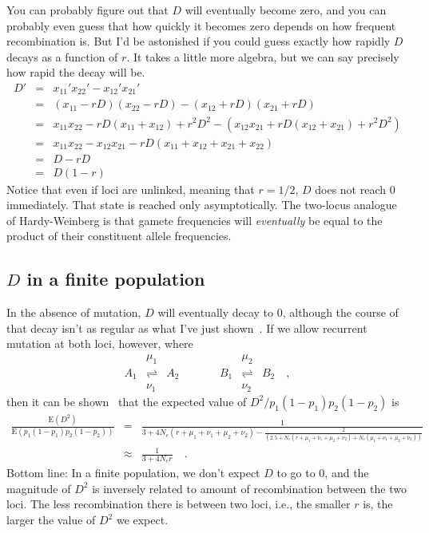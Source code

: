 \documentclass[12pt]{article}
\begin{document}
You can probably figure out that $D$ will eventually become zero, and
you can probably even guess that how quickly it becomes zero depends
on how frequent recombination is. But I'd be astonished if you could
guess exactly how rapidly $D$ decays as a function of $r$.  It takes a
little more algebra, but we can say precisely how rapid the decay will
be.
\begin{eqnarray*}
D' &=& x_{11}'x_{22}' - x_{12}'x_{21}' \\
   &=& (x_{11} - rD)(x_{22} - rD) - (x_{12} + rD)(x_{21} + rD) \\
   &=& x_{11}x_{22} - rD(x_{11} + x_{12}) + r^2D^2
       - (x_{12}x_{21} + rD(x_{12} + x_{21}) + r^2D^2) \\
   &=& x_{11}x_{22} - x_{12}x_{21} - rD(x_{11} + x_{12} + x_{21} + x_{22}) \\
   &=& D - rD \\
   &=& D(1-r)
\end{eqnarray*}
Notice that even if loci are unlinked, meaning that $r = 1/2$, $D$
does not reach 0 immediately. That state is reached only
asymptotically. The two-locus analogue of Hardy-Weinberg is that
gamete frequencies will {\it eventually\/} be equal to the product of
their constituent allele frequencies.

\subsection*{$D$ in a finite population}

In the absence of mutation, $D$ will eventually decay to 0, although
the course of that decay isn't as regular as what I've just
shown~\cite{Hill-Robertson-1968}. If we allow recurrent mutation at
both loci, however, where
\[
\begin{array}{ccccccc}
    &\mu_1            &     &      &     &\mu_2 \\
A_1 &\rightleftharpoons& A_2 &\qquad& B_1 &\rightleftharpoons& B_2
\quad , \\
    &\nu_1            &     &      &     &\nu_2 
\end{array}
\]
then it can be shown~\cite{Ohta-Kimura-1969} that the expected value
of $D^2/p_1(1-p_1)p_2(1-p_2)$ is 
{\scriptsize
\begin{eqnarray*}
\frac{\mbox{E}(D^2)}{\mbox{E}(p_1(1-p_1)p_2(1-p_2))}
&=& \frac{1}{3 + 4N_e(r+\mu_1+\nu_1+\mu_2+\nu_2)
                           - \frac{2}{(2.5 + N_e(r+\mu_1+\nu_1+\mu_2+\nu_2)
                              + N_e(\mu_1+\nu_1+\mu_2+\nu_2))}} \\
&\approx& \frac{1}{3 + 4N_er} \quad .
\end{eqnarray*}
}
\noindent Bottom line: In a finite population, we don't expect $D$ to
go to 0, and the magnitude of $D^2$ is inversely related to amount of
recombination between the two loci. The less recombination there is
between two loci, i.e., the smaller $r$ is, the larger the value of
$D^2$ we expect.
\end{document}
